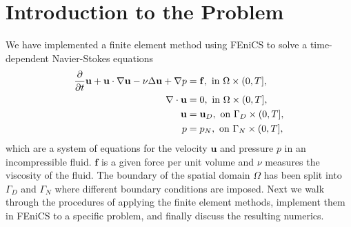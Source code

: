 \section{\fontsize{12}{12}\selectfont Introduction to the Problem}
\label{sec:introToProblem}

We have implemented a finite element method using FEniCS to solve a time-dependent Navier-Stokes equations
\vspace{-0.2cm}
\begin{align}
    \frac{\partial}{\partial t} \mathbf{u} + \mathbf{u} \cdot \nabla \mathbf{u} - \nu \Delta \mathbf{u} + \nabla p & = \mathbf{f}, \text{ in } \Omega \times (0,T],    
    \label{eq:NavierStokes}\\
    \nabla \cdot \mathbf{u} & = 0,  \text{ in } \Omega \times (0,T],
    \label{eq:Incompressibility}\\
    \mathbf{u} & = \mathbf{u}_D, \text{ on } \Gamma_D \times (0,T],
    \label{eq:DirichletBoundary}\\
    p & = p_N, \text{ on } \Gamma_N \times (0,T],
    \label{eq:NeumannBoundary}
\vspace{-0.2cm}
\end{align}
which are a system of equations for the velocity $\mathbf{u}$ and pressure $p$ in an incompressible fluid. $\mathbf{f}$ is a given force per unit volume and $\nu$ measures the viscosity of the fluid. The boundary of the spatial domain $\Omega$ has been split into $\Gamma_D$ and $\Gamma_N$ where different boundary conditions are imposed. Next we walk through the procedures of applying the finite element methods, implement them in FEniCS to a specific problem, and finally discuss the resulting numerics.